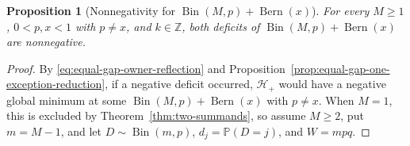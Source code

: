 \documentclass[11pt]{article}
\numberwithin{equation}{section}
\newtheorem{proposition}[theorem]{Proposition}
\theoremstyle{definition}
\theoremstyle{remark}
\DeclareMathOperator{\Bern}{Bern}
\DeclareMathOperator{\Bin}{Bin}
\newcommand{\Pp}{\mathbb P}
\newcommand{\Z}{\mathbb Z}
\begin{document}
\begin{samepage}
\begin{proposition}[Nonnegativity for $\Bin(M,p)+\Bern(x)$]
\label{prop:one-exceptional-bernoulli}
For every $M\geq1$, $0<p,x<1$ with $p\ne x$, and $k\in\Z$, both deficits of
$\Bin(M,p)+\Bern(x)$ are nonnegative.
\end{proposition}
\end{samepage}

\begin{proof}
By \eqref{eq:equal-gap-owner-reflection} and Proposition~\ref{prop:equal-gap-one-exception-reduction},
if a negative deficit occurred, $\mathcal H_+$ would have a negative global
minimum at some $\Bin(M,p)+\Bern(x)$ with $p\ne x$. When $M=1$, this is
excluded by Theorem~\ref{thm:two-summands}, so assume $M\geq2$, put $m=M-1$,
and let $D\sim\Bin(m,p)$, $d_j=\Pp(D=j)$, and $W=mpq$.


\end{proof}
\end{document}
